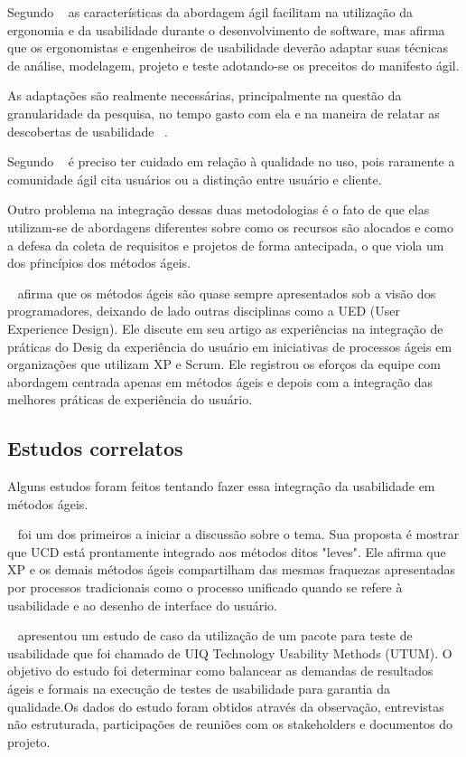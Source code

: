 	Segundo ~ as características da abordagem ágil facilitam na utilização da ergonomia e da usabilidade durante o desenvolvimento de software, mas afirma que os ergonomistas e engenheiros de usabilidade deverão adaptar suas técnicas de análise, modelagem, projeto e teste adotando-se os preceitos do manifesto ágil.
	
	As adaptações são realmente necessárias, principalmente na questão da granularidade da pesquisa, no tempo gasto com ela e na maneira de relatar as descobertas de usabilidade ~\cite{santos2012}.

	Segundo ~ é preciso ter cuidado em relação à qualidade no uso, pois raramente a comunidade ágil cita usuários ou a distinção entre usuário e cliente.

	Outro problema na integração dessas duas metodologias é o fato de que elas utilizam-se de abordagens diferentes sobre como os recursos são alocados e como a defesa da coleta de requisitos e projetos de forma antecipada, o que viola um dos pŕincípios dos métodos ágeis.

	~ afirma que os métodos ágeis são quase sempre apresentados sob a visão dos programadores, deixando de lado outras disciplinas como a UED (User Experience Design). Ele discute em seu artigo as experiências na integração de práticas do Desig da experiência do usuário em iniciativas de processos ágeis em organizações que utilizam XP e Scrum. Ele registrou os eforços da equipe com abordagem centrada apenas em métodos ágeis e depois com a integração das melhores práticas de experiência do usuário.

\subsection{Estudos correlatos}

Alguns estudos foram feitos tentando fazer essa integração da usabilidade em métodos ágeis. 

~ foi um dos primeiros a iniciar a discussão sobre o tema. Sua proposta é mostrar que UCD está prontamente integrado aos métodos ditos "leves". Ele afirma que XP e os demais métodos ágeis compartilham das mesmas fraquezas apresentadas por processos tradicionais como o processo unificado quando se refere à usabilidade e ao desenho de interface do usuário.

~ apresentou um estudo de caso da utilização de um pacote para teste de usabilidade que foi chamado de UIQ Technology Usability Methods (UTUM). O objetivo do estudo foi determinar como balancear as demandas de resultados ágeis e formais na execução de testes de usabilidade para garantia da qualidade.Os dados do estudo foram obtidos através da observação, entrevistas não estruturada, participações de reuniões com os stakeholders e documentos do projeto.

